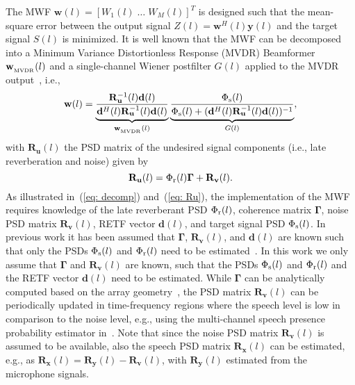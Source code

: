 \documentclass{article}
\begin{document}
The MWF $\mathbf{w}(l) = [W_1(l) \; \ldots \; W_M(l)]^T$ is designed such that the mean-square error between the output signal $Z(l) = \mathbf{w}^H(l)\mathbf{y}(l)$ and the target signal $S(l)$ is minimized.
It is well known that the MWF can be decomposed into a Minimum Variance Distortionless Response (MVDR) Beamformer $\mathbf{w}_{_{\rm MVDR}}(l)$ and a single-channel Wiener postfilter $G(l)$ applied to the MVDR output~\cite{Simmer_book_2001}, i.e.,
\begin{equation}
\label{eq: decomp}
\mathbf{w}(l) = \underbrace{\frac{ \mathbf{R}^{-1}_{\mathbf{u}}(l) \mathbf{d}(l)}{ \mathbf{d}^H(l)  \mathbf{R}^{-1}_{\mathbf{u}}(l) \mathbf{d}(l)}}_{\mathbf{w}_{_{\rm MVDR}}(l)} \underbrace{\frac{\Phi_{\rm s}(l)}{\Phi_{\rm s}(l) + (\mathbf{d}^H(l) \mathbf{R}^{-1}_{\mathbf{u}}(l) \mathbf{d}(l))^{-1}}}_{G(l)},
\end{equation}
with $\mathbf{R}_{\mathbf{u}}(l)$ the PSD matrix of the undesired signal components (i.e., late reverberation and noise) given by
\begin{equation}
\label{eq: Ru}
\mathbf{R}_{\mathbf{u}}(l) = \Phi_{\rm r}(l) \boldsymbol{\Gamma}  + \mathbf{R}_{\mathbf{v}}(l).
\end{equation}
As illustrated in~(\ref{eq: decomp}) and~(\ref{eq: Ru}), the implementation of the MWF requires knowledge of the late reverberant PSD $\Phi_{\rm r}(l)$, coherence matrix $\boldsymbol{\Gamma}$, noise PSD matrix $\mathbf{R}_{\mathbf{v}}(l)$, RETF vector $\mathbf{d}(l)$, and target signal PSD $\Phi_{\rm s}(l)$.
In previous work it has been assumed that $\boldsymbol{\Gamma}$, $\mathbf{R}_{\mathbf{v}}(l)$, and $\mathbf{d}(l)$ are known such that only the PSDs $\Phi_{\rm s}(l)$ and $\Phi_{\rm r}(l)$ need to be estimated~\cite{Kuklasinski_EUSIPCO_2014g,Braun_EUSIPCO_2013,Braun_EURASIP_2015,Kuklasinski_ITASLP_2016,Schwartz_WASPAA_2015,Schwartz_ICASSP_2016}.
In this work we only assume that $\boldsymbol{\Gamma}$ and $\mathbf{R}_{\mathbf{v}}(l)$ are known, such that the PSDs $\Phi_{\rm s}(l)$ and $\Phi_{\rm r}(l)$ and the RETF vector $\mathbf{d}(l)$ need to be estimated.
While $\boldsymbol{\Gamma}$ can be analytically computed based on the array geometry~\cite{Braun_EUSIPCO_2013,Braun_EURASIP_2015,Schwartz_WASPAA_2015,Schwartz_ICASSP_2016}, the PSD matrix $\mathbf{R}_{\mathbf{v}}(l)$ can be periodically updated in time-frequency regions where the speech level is low in comparison to the noise level, e.g., using the multi-channel speech presence probability estimator in~\cite{Souden_ITASLP_2010}.
Note that since the noise PSD matrix $\mathbf{R}_{\mathbf{v}}(l)$ is assumed to be available, also the speech PSD matrix $\mathbf{R}_{\mathbf{x}}(l)$ can be estimated, e.g., as $\mathbf{R}_{\mathbf{x}}(l) = \mathbf{R}_{\mathbf{y}}(l) - \mathbf{R}_{\mathbf{v}}(l)$, with $\mathbf{R}_{\mathbf{y}}(l)$ estimated from the microphone signals.
\end{document}
